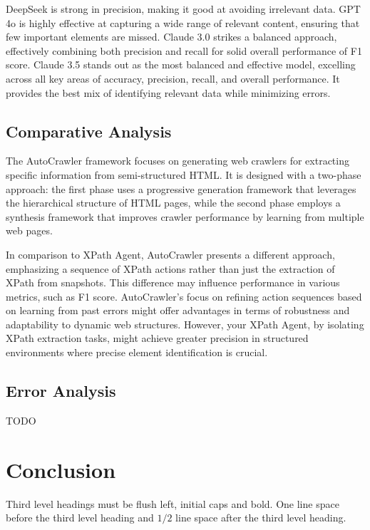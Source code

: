 \documentclass[a4paper]{article}
\begin{document}
DeepSeek is strong in precision, making it good at avoiding irrelevant data. GPT 4o is highly effective at capturing a wide range of relevant content, ensuring that few important elements are missed. Claude 3.0 strikes a balanced approach, effectively combining both precision and recall for solid overall performance of F1 score. Claude 3.5 stands out as the most balanced and effective model, excelling across all key areas of accuracy, precision, recall, and overall performance. It provides the best mix of identifying relevant data while minimizing errors.
    

\subsection{Comparative Analysis} 
The AutoCrawler\cite{huang2024autoscraperprogressiveunderstandingweb} framework focuses on generating web crawlers for extracting specific information from semi-structured HTML. 
It is designed with a two-phase approach: the first phase uses a progressive generation framework that leverages the hierarchical 
structure of HTML pages, while the second phase employs a synthesis framework that improves crawler performance by learning from 
multiple web pages. 

In comparison to XPath Agent, AutoCrawler presents a different approach, emphasizing a sequence of XPath actions rather than just the extraction of XPath from snapshots. This difference may influence performance in various metrics, such as F1 score. 
AutoCrawler's focus on refining action sequences based on learning from past errors might offer advantages in terms of robustness 
and adaptability to dynamic web structures. However, your XPath Agent, by isolating XPath extraction tasks, might achieve greater 
precision in structured environments where precise element identification is crucial.

\subsection{Error Analysis} TODO



\section{Conclusion }

Third level headings must be flush left, initial caps and bold.
One line space before the third level heading and $1/2$ line
space after the third level heading.
\end{document}
